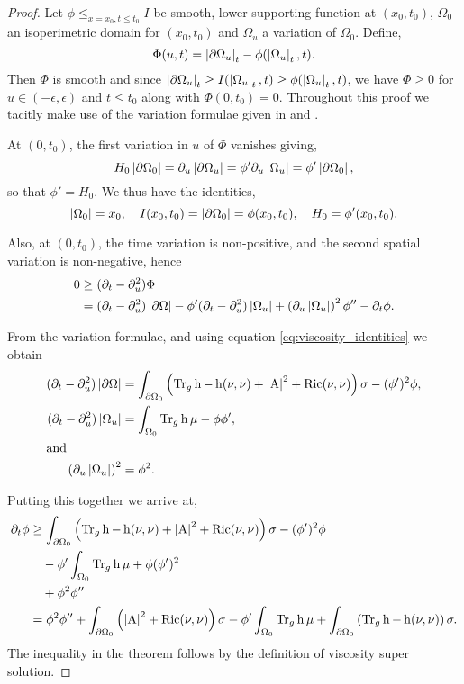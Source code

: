 \documentclass{amsart}
\begin{document}
\begin{proof}
Let \(\phi \leq_{x=x_0, t\leq t_0} I\) be smooth, lower supporting function at \((x_0, t_0)\), \(\Omega_0\) an isoperimetric domain for \((x_0, t_0)\) and \(\Omega_u\) a variation of \(\Omega_0\). Define,
\[
\Phi(u, t) = \left|{\partial {\Omega_u}}\right|_t - \phi(\left|{\Omega_u}\right|_t, t).
\]
Then \(\Phi\) is smooth and since \(\left|{\partial {\Omega_u}}\right|_t \geq I(\left|{\Omega_u}\right|_t, t) \geq \phi(\left|{\Omega_u}\right|_t, t)\), we have \(\Phi \geq 0\) for \(u \in (-\epsilon, \epsilon)\) and \(t \leq t_0\) along with \(\Phi(0, t_0) = 0\). Throughout this proof we tacitly make use of the variation formulae given in  and .

At \((0, t_0)\), the first variation in \(u\) of \(\Phi\) vanishes giving,
\[
H_0 \left|{\partial {\Omega_0}}\right| = \partial_u \left|{\partial {\Omega_u}}\right| = \phi' \partial_u \left|{\Omega_u}\right| = \phi' \left|{\partial {\Omega_0}}\right|,
\]
so that \(\phi' = H_0\). We thus have the identities,
\begin{equation}
\label{eq:viscosity_identities}
\left|{\Omega_0}\right| = x_0, \quad I(x_0, t_0) = \left|{\partial {\Omega_0}}\right| = \phi(x_0, t_0), \quad H_0 = \phi'(x_0, t_0).
\end{equation}

Also, at \((0, t_0)\), the time variation is non-positive, and the second spatial variation is non-negative, hence
\[
\begin{split}
0 &\geq (\partial_t - \partial_u^2) \Phi \\
&= (\partial_t - \partial_u^2) \left|{\partial {\Omega}}\right| - \phi'(\partial_t - \partial_u^2) \left|{\Omega_u}\right| + \left(\partial_u \left|{\Omega_u}\right|\right)^2 \phi'' - \partial_t \phi.
\end{split}
\]

From the variation formulae, and using equation \eqref{eq:viscosity_identities} we obtain
\begin{align*}
(\partial_t - \partial_u^2) \left|{\partial {\Omega}}\right| &= \int_{\partial {\Omega_0}} \left(\operatorname{Tr}_g \operatorname{h} - \operatorname{h}(\nu, \nu) + \left|{\operatorname{A}}\right|^2 + \operatorname{Ric}(\nu, \nu)\right) \sigma - (\phi')^2 \phi, \\
(\partial_t - \partial_u^2) \left|{\Omega_u}\right| &= \int_{\Omega_0} \operatorname{Tr}_g \operatorname{h} \mu - \phi \phi', \\
\intertext{and}
\left(\partial_u \left|{\Omega_u}\right|\right)^2 &= \phi^2.
\end{align*}

Putting this together we arrive at,
\[
\begin{split}
\partial_t \phi &\geq \int_{\partial {\Omega_0}} \left(\operatorname{Tr}_g \operatorname{h} - \operatorname{h}(\nu, \nu) + \left|{\operatorname{A}}\right|^2 + \operatorname{Ric}(\nu, \nu) \right)\sigma - (\phi')^2 \phi \\
&\quad - \phi'\int_{\Omega_0} \operatorname{Tr}_g \operatorname{h} \mu + \phi (\phi')^2 \\
&\quad + \phi^2 \phi'' \\
&= \phi^2 \phi'' + \int_{\partial {\Omega_0}} \left(\left|{\operatorname{A}}\right|^2 + \operatorname{Ric}(\nu, \nu)\right) \sigma - \phi'\int_{\Omega_0} \operatorname{Tr}_g \operatorname{h} \mu + \int_{\partial {\Omega_0}} \left(\operatorname{Tr}_g \operatorname{h} - \operatorname{h}(\nu, \nu)\right) \sigma.
\end{split}
\]
The inequality in the theorem follows by the definition of viscosity super solution.


\end{proof}
\end{document}
